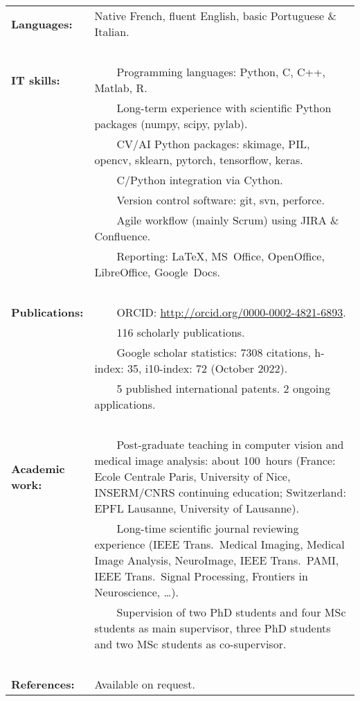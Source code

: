 \documentclass[english,10pt,a4paper]{scrartcl}
\newcommand{\tabitem}{~~\llap{\textbullet}~~}
\begin{document}
\begin{tabular}{p{0.2\linewidth}p{0.8\linewidth}}
  \textbf{Languages:} & Native French, fluent English, basic Portuguese \& Italian.\\
  \ \\
  \textbf{IT skills:} &
  \tabitem Programming languages: Python, C, C++, Matlab, R.\\
  & \tabitem Long-term experience with scientific Python packages (numpy, scipy, pylab).\\
  & \tabitem CV/AI Python packages: skimage, PIL, opencv, sklearn, pytorch, tensorflow, keras.\\
  & \tabitem  C/Python integration via Cython.\\
  & \tabitem Version control software: git, svn, perforce.\\
  & \tabitem Agile workflow (mainly Scrum) using JIRA \& Confluence.\\
  & \tabitem Reporting: \LaTeX, MS~Office, OpenOffice, LibreOffice, Google~Docs.\\
  \ \\
  \textbf{Publications:} &
  \tabitem ORCID: \url{http://orcid.org/0000-0002-4821-6893}. \\
  & \tabitem 116 scholarly publications.\\
  & \tabitem Google scholar statistics: 7308 citations, h-index: 35, i10-index: 72 (October 2022).\\
  & \tabitem 5 published international patents. 2 ongoing applications.\\
  \ \\
  \textbf{Academic work:} & 
  \tabitem Post-graduate teaching in computer vision and medical image analysis: about 100~hours (France: Ecole Centrale Paris, University of Nice, INSERM/CNRS continuing education; Switzerland: EPFL Lausanne, University of Lausanne).\\
  & \tabitem Long-time scientific journal reviewing experience (IEEE Trans.~Medical Imaging, Medical Image Analysis, NeuroImage, IEEE Trans.~PAMI, IEEE Trans.~Signal Processing, Frontiers in Neuroscience, \ldots).\\
  & \tabitem Supervision of two PhD students and four MSc students as main supervisor, three PhD students and two MSc students as co-supervisor.\\
  \ \\
  \textbf{References:} & Available on request.
\end{tabular}



%
\end{document}
